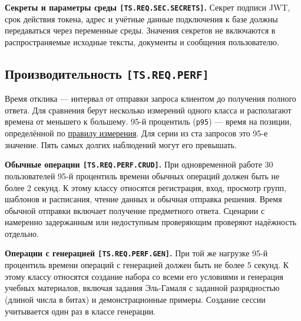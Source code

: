 \documentclass[12pt,a4paper]{article}
\begin{document}
\hypertarget{ts-req-sec-secrets}{} \textbf{Секреты и параметры среды \texttt{[TS.\allowbreak{}REQ.\allowbreak{}SEC.\allowbreak{}SECRETS]}.} Секрет подписи JWT, срок действия токена, адрес и учётные данные подключения к базе должны передаваться через переменные среды. Значения секретов не включаются в распространяемые исходные тексты, документы и сообщения пользователю.

\subsection{\texorpdfstring{Производительность \texttt{[TS.\allowbreak{}REQ.\allowbreak{}PERF]}}{Производительность }}\label{35-ux43fux440ux43eux438ux437ux432ux43eux434ux438ux442ux435ux43bux44cux43dux43eux441ux442ux44c-tsreqperf}

\hypertarget{35-производительность-tsreqperf}{}

\hypertarget{ts-req-perf}{}

Время отклика --- интервал от отправки запроса клиентом до получения полного ответа. Для сравнения берут несколько измерений одного класса и располагают времена от меньшего к большему. 95-й процентиль (\texttt{p95}) --- время на позиции, определённой по {\hyperlink{ts-req-perf-measure}{правилу измерения}}. Для серии из ста запросов это 95-е значение. Пять самых долгих наблюдений могут его превышать.

\hypertarget{ts-req-perf-crud}{} \textbf{Обычные операции \texttt{[TS.\allowbreak{}REQ.\allowbreak{}PERF.\allowbreak{}CRUD]}.} При одновременной работе 30 пользователей 95-й процентиль времени обычных операций должен быть не более 2 секунд. К этому классу относятся регистрация, вход, просмотр групп, шаблонов и расписания, чтение данных и обычная отправка решения. Время обычной отправки включает получение предметного ответа. Сценарии с намеренно задержанным или недоступным проверяющим проверяют надёжность отдельно.

\hypertarget{ts-req-perf-gen}{} \textbf{Операции с генерацией \texttt{[TS.\allowbreak{}REQ.\allowbreak{}PERF.\allowbreak{}GEN]}.} При той же нагрузке 95-й процентиль времени операций с генерацией должен быть не более 5 секунд. К этому классу относятся создание набора со всеми его условиями и генерация учебных материалов, включая задания Эль-Гамаля с заданной разрядностью (длиной числа в битах) и демонстрационные примеры. Создание сессии учитывается один раз в классе генерации.
\end{document}
